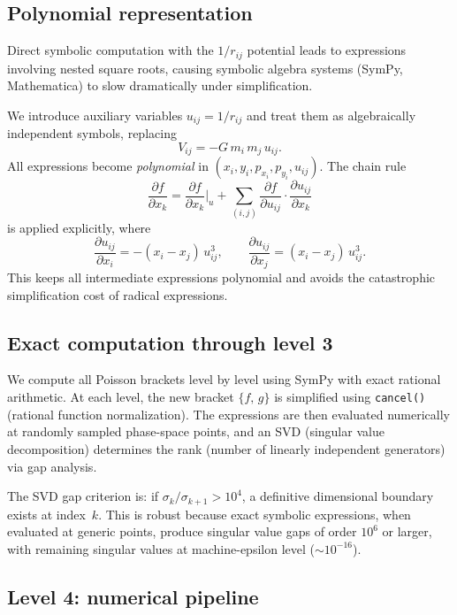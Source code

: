 \documentclass[11pt,a4paper]{article}
\theoremstyle{remark}
\newcommand{\pb}[2]{\{#1,\,#2\}}
\begin{document}
\subsection{Polynomial representation}

Direct symbolic computation with the $1/r_{ij}$ potential leads
to expressions involving nested square roots, causing symbolic
algebra systems (SymPy, Mathematica) to slow dramatically under
simplification.

We introduce auxiliary variables $u_{ij} = 1/r_{ij}$ and treat
them as algebraically independent symbols, replacing
\[
  V_{ij} = -G\,m_i\,m_j\, u_{ij}.
\]
All expressions become \emph{polynomial} in
$(x_i, y_i, p_{x_i}, p_{y_i}, u_{ij})$.  The chain rule
\[
  \frac{\partial f}{\partial x_k}
  = \frac{\partial f}{\partial x_k}\bigg|_{u}
  + \sum_{(i,j)} \frac{\partial f}{\partial u_{ij}}
    \cdot \frac{\partial u_{ij}}{\partial x_k}
\]
is applied explicitly, where
\[
  \frac{\partial u_{ij}}{\partial x_i}
  = -(x_i - x_j)\,u_{ij}^3, \qquad
  \frac{\partial u_{ij}}{\partial x_j}
  = (x_i - x_j)\,u_{ij}^3.
\]
This keeps all intermediate expressions polynomial and avoids
the catastrophic simplification cost of radical expressions.

\subsection{Exact computation through level 3}

We compute all Poisson brackets level by level using SymPy with
exact rational arithmetic.  At each level, the new bracket
$\pb{f}{g}$ is simplified using \texttt{cancel()} (rational
function normalization).  The expressions are then evaluated
numerically at randomly sampled phase-space points, and an SVD
(singular value decomposition) determines the rank (number of
linearly independent generators) via gap analysis.

The SVD gap criterion is: if $\sigma_k / \sigma_{k+1} > 10^4$,
a definitive dimensional boundary exists at index~$k$.  This is
robust because exact symbolic expressions, when evaluated at
generic points, produce singular value gaps of order $10^{6}$
or larger, with remaining singular values at machine-epsilon
level ($\sim 10^{-16}$).

\subsection{Level 4: numerical pipeline}
\end{document}
